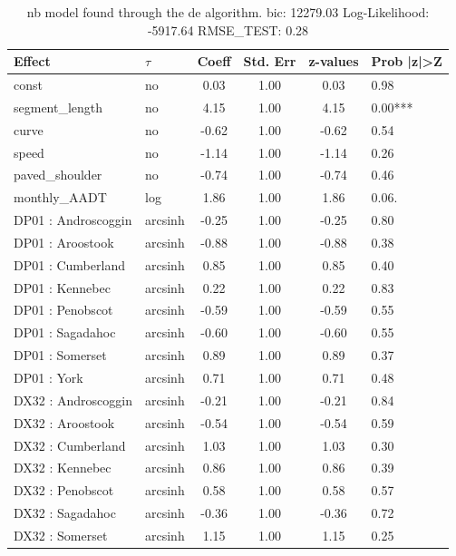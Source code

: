 \begin{table}
	\caption{nb model found through the de algorithm. bic: 12279.03 Log-Likelihood: -5917.64 RMSE_TEST: 0.28}
	\begin{center}
		\begin{tabular}{|l|l|c|c|c|l|}
			\hline
			Effect & $\tau$ & Coeff & Std. Err & z-values & Prob |z|>Z \\
			\hline
			const & no & 0.03 & 1.00 & 0.03 & 0.98 \\
			\hline
			segment_length & no & 4.15 & 1.00 & 4.15 & 0.00*** \\
			\hline
			curve & no & -0.62 & 1.00 & -0.62 & 0.54 \\
			\hline
			speed & no & -1.14 & 1.00 & -1.14 & 0.26 \\
			\hline
			paved_shoulder & no & -0.74 & 1.00 & -0.74 & 0.46 \\
			\hline
			monthly_AADT & log & 1.86 & 1.00 & 1.86 & 0.06. \\
			\hline
			DP01 : Androscoggin & arcsinh & -0.25 & 1.00 & -0.25 & 0.80 \\
			\hline
			DP01 : Aroostook & arcsinh & -0.88 & 1.00 & -0.88 & 0.38 \\
			\hline
			DP01 : Cumberland & arcsinh & 0.85 & 1.00 & 0.85 & 0.40 \\
			\hline
			DP01 : Kennebec & arcsinh & 0.22 & 1.00 & 0.22 & 0.83 \\
			\hline
			DP01 : Penobscot & arcsinh & -0.59 & 1.00 & -0.59 & 0.55 \\
			\hline
			DP01 : Sagadahoc & arcsinh & -0.60 & 1.00 & -0.60 & 0.55 \\
			\hline
			DP01 : Somerset & arcsinh & 0.89 & 1.00 & 0.89 & 0.37 \\
			\hline
			DP01 : York & arcsinh & 0.71 & 1.00 & 0.71 & 0.48 \\
			\hline
			DX32 : Androscoggin & arcsinh & -0.21 & 1.00 & -0.21 & 0.84 \\
			\hline
			DX32 : Aroostook & arcsinh & -0.54 & 1.00 & -0.54 & 0.59 \\
			\hline
			DX32 : Cumberland & arcsinh & 1.03 & 1.00 & 1.03 & 0.30 \\
			\hline
			DX32 : Kennebec & arcsinh & 0.86 & 1.00 & 0.86 & 0.39 \\
			\hline
			DX32 : Penobscot & arcsinh & 0.58 & 1.00 & 0.58 & 0.57 \\
			\hline
			DX32 : Sagadahoc & arcsinh & -0.36 & 1.00 & -0.36 & 0.72 \\
			\hline
			DX32 : Somerset & arcsinh & 1.15 & 1.00 & 1.15 & 0.25 \\

\end{tabular}
\end{center}
\end{table}
